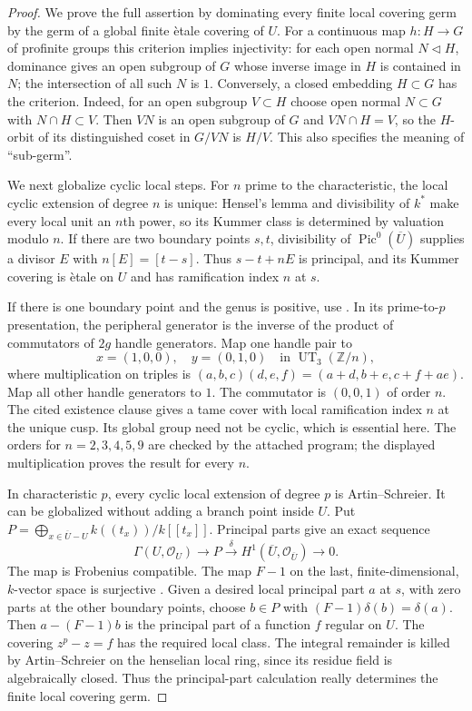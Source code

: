 \begin{proof}
We prove the full assertion by dominating every finite local covering
germ by the germ of a global finite \`etale covering of $U$.
For a continuous map $h:H\to G$ of profinite groups this criterion
implies injectivity: for each open normal $N\lhd H$, dominance gives
an open subgroup of $G$ whose inverse image in $H$ is contained in
$N$; the intersection of all such $N$ is $1$. Conversely, a closed
embedding $H\subset G$ has the criterion. Indeed, for an open
subgroup $V\subset H$ choose open normal $N\subset G$ with
$N\cap H\subset V$. Then $VN$ is an open subgroup of $G$ and
$VN\cap H=V$, so the $H$-orbit of its distinguished coset in
$G/VN$ is $H/V$. This also specifies the meaning of ``sub-germ''.

We next globalize cyclic local steps. For $n$ prime to the
characteristic, the local cyclic extension of degree $n$ is unique:
Hensel's lemma and divisibility of $k^*$ make every local unit an
$n$th power, so its Kummer class is determined by valuation modulo
$n$. If there are two boundary points $s,t$, divisibility of
$\operatorname{Pic}^0(\overline U)$ supplies a divisor $E$ with
$n[E]=[t-s]$. Thus $s-t+nE$ is principal, and its Kummer covering is
\`etale on $U$ and has ramification index $n$ at $s$.

If there is one boundary point and the genus is positive, use
\citep[XIII, Corollaire 2.12]{SGA1}. In its prime-to-$p$ presentation,
the peripheral generator is the inverse of the product of
commutators of $2g$ handle generators. Map one handle pair to
\[
 x=(1,0,0),\quad y=(0,1,0)
 \quad\text{in }\operatorname{UT}_3(\mathbb Z/n),
\]
where multiplication on triples is
$(a,b,c)(d,e,f)=(a+d,b+e,c+f+ae)$. Map all other handle generators
to $1$. The commutator is $(0,0,1)$ of order $n$. The cited
existence clause gives a tame cover with local ramification index
$n$ at the unique cusp. Its global group need not be cyclic, which
is essential here. The orders for $n=2,3,4,5,9$ are checked by the
attached program; the displayed multiplication proves the result
for every $n$.

In characteristic $p$, every cyclic local extension of degree $p$
is Artin--Schreier. It can be globalized without adding a branch
point inside $U$. Put $P=\bigoplus_{x\in\overline U-U}
k((t_x))/k[[t_x]]$. Principal parts give an exact sequence
\[
 \Gamma(U,\mathcal O_U)\longrightarrow P
 \xrightarrow{\delta} H^1(\overline U,\mathcal O_{\overline U})
 \longrightarrow0.
\]
The map is Frobenius compatible. The map $F-1$ on the last,
finite-dimensional, $k$-vector space is surjective
\citep[Tag 0A3J, Lemma 59.63.2]{StacksAS}. Given a desired local
principal part $a$ at $s$, with zero parts at the other boundary
points, choose $b\in P$ with
$(F-1)\delta(b)=\delta(a)$. Then $a-(F-1)b$ is the principal part
of a function $f$ regular on $U$. The covering $z^p-z=f$ has the
required local class. The integral remainder is killed by
Artin--Schreier on the henselian local ring, since its residue
field is algebraically closed. Thus the principal-part calculation
really determines the finite local covering germ.


\end{proof}
